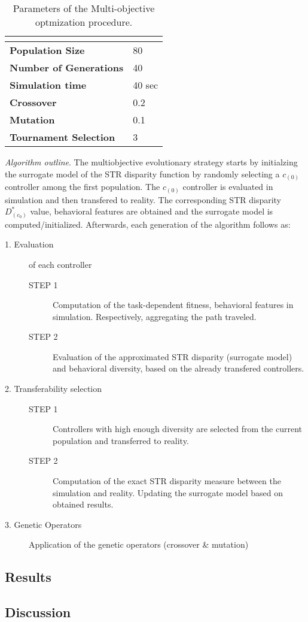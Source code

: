 \begin{table}[H]
\begin{tabular}{ll}
\hline
\textbf{}                      & \textbf{} \\ \hline
\textbf{Population Size}       & 80        \\
\textbf{Number of Generations} & 40        \\
\textbf{Simulation time}       & 40 sec    \\
\textbf{Crossover}             & 0.2       \\
\textbf{Mutation}              & 0.1       \\
\textbf{Tournament Selection}  & 3        
\end{tabular}
\caption{Parameters of the Multi-objective optmization procedure.}
\label{tab:moea_parameters}
\end{table}


\emph{Algorithm outline}. The multiobjective evolutionary strategy starts by initialzing the surrogate model of the STR disparity function by randomly selecting a $c_{(0)}$ controller among the first population. The $c_{(0)}$ controller is evaluated in simulation and then transfered to reality. The corresponding STR disparity $ D^{*}_{(c_0)}$ value, behavioral features are obtained and the surrogate model is computed/initialized. Afterwards, each generation of the algorithm follows as:

\begin{description}
	\item[1. Evaluation] of each controller
		\begin{description}
			\item[STEP 1] Computation of the task-dependent fitness, behavioral features in simulation. Respectively, aggregating the path traveled.
			\item[STEP 2] Evaluation of the approximated STR disparity (surrogate model) and behavioral diversity, based on the already transfered controllers.
		\end{description}
	\item[2. Transferability selection] 
		\begin{description}
			\item[STEP 1] Controllers with high enough diversity are selected from the current population and transferred to reality.
			\item[STEP 2] Computation of the exact STR disparity measure between the simulation and reality. Updating the surrogate model based on obtained results.
		\end{description}
	\item[3. Genetic Operators] Application of the genetic operators (crossover & mutation)
\end{description}


\subsection{Results}

\subsection{Discussion}



